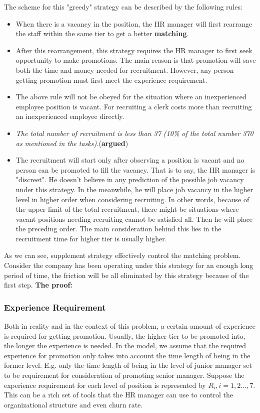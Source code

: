 \documentclass[tcn = 37075, sheet = true, abstract = true]{mcmthesis}
\begin{document}
The scheme for this "greedy" strategy can be described by the following rules:
\begin{itemize}
\item When there is a vacancy in the position, the HR manager will first rearrange the staff within the same tier to get a better \textbf{\Large{matching}}.
\item After this rearrangement, this strategy requires the HR manager to first seek opportunity to make promotions. The main reason is that promotion will save both the time and money needed for recruitment. However, any person getting promotion must first meet the experience requirement.
\item The above rule will not be obeyed for the situation where an inexperienced employee position is vacant. For recruiting a clerk costs more than recruiting an inexperienced employee directly.
\item \textit{The total number of recruitment is less than 37 (10\% of the total number 370 as mentioned in the tasks).}(\textbf{argued})
\item The recruitment will start only after observing a position is vacant and no person can be promoted to fill the vacancy. That is to say, the HR manager is "discreet". He doesn't believe in any prediction of the possible job vacancy under this strategy. In the meanwhile, he will place job vacancy in the higher level in higher order when considering recruiting. In other words, because of the upper limit of the total recruitment, there might be situations where vacant positions needing recruiting cannot be satisfied all. Then he will place the preceding order. The main consideration behind this lies in the recruitment time for higher tier is usually higher.
\end{itemize}

As we can see, supplement strategy effectively control the matching problem. Consider the company has been operating under this strategy for an enough long period of time, the friction will be all eliminated by this strategy because of the first step. \textbf{The proof:} \\

\subsubsection{Experience Requirement}

Both in reality and in the context of this problem, a certain amount of experience is required for getting promotion. Usually, the higher tier to be promoted into, the longer the experience is needed. In the model, we assume that the required experience for promotion only takes into account the time length of being in the former level. E.g. only the time length of being in the level of junior manager set to be requirement for consideration of promoting senior manager. Suppose the experience requirement for each level of position is represented by $R_i, i = 1, 2...,7$. This can be a rich set of tools that the HR manager can use to control the organizational structure and even churn rate.
\end{document}
